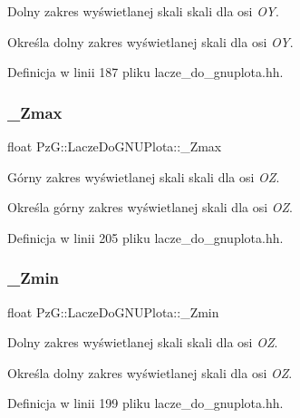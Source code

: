 Dolny zakres wyświetlanej skali skali dla osi {\itshape OY}. 

Określa dolny zakres wyświetlanej skali dla osi {\itshape OY}. 

Definicja w linii 187 pliku lacze\+\_\+do\+\_\+gnuplota.\+hh.

\mbox{\label{class_pz_g_1_1_lacze_do_g_n_u_plota_a26949eedd421832f0f206ce3c8f90694}} 
\subsubsection{\texorpdfstring{\+\_\+\+Zmax}{\_Zmax}}
{\footnotesize\ttfamily float Pz\+G\+::\+Lacze\+Do\+G\+N\+U\+Plota\+::\+\_\+\+Zmax\hspace{0.3cm}{\ttfamily [protected]}}



Górny zakres wyświetlanej skali skali dla osi {\itshape OZ}. 

Określa górny zakres wyświetlanej skali dla osi {\itshape OZ}. 

Definicja w linii 205 pliku lacze\+\_\+do\+\_\+gnuplota.\+hh.

\mbox{\label{class_pz_g_1_1_lacze_do_g_n_u_plota_a8f9797e881df35f4206cb7d8030e5edc}} 
\subsubsection{\texorpdfstring{\+\_\+\+Zmin}{\_Zmin}}
{\footnotesize\ttfamily float Pz\+G\+::\+Lacze\+Do\+G\+N\+U\+Plota\+::\+\_\+\+Zmin\hspace{0.3cm}{\ttfamily [protected]}}



Dolny zakres wyświetlanej skali skali dla osi {\itshape OZ}. 

Określa dolny zakres wyświetlanej skali dla osi {\itshape OZ}. 

Definicja w linii 199 pliku lacze\+\_\+do\+\_\+gnuplota.\+hh.

